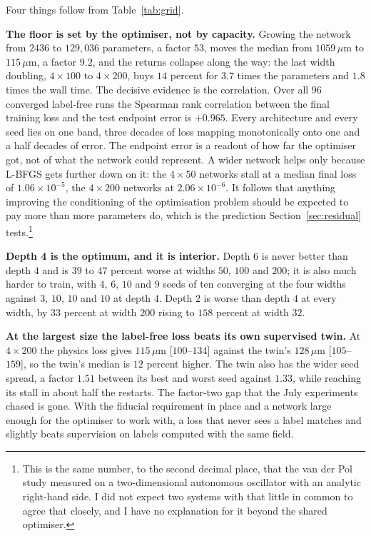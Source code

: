 \documentclass[11pt,a4paper]{article}
\newcommand{\um}{\ensuremath{\,\mu\mathrm{m}}}
\begin{document}
Four things follow from Table~\ref{tab:grid}.

\textbf{The floor is set by the optimiser, not by capacity.} Growing the network
from $2436$ to $129{,}036$ parameters, a factor $53$, moves the median from
$1059\um$ to $115\um$, a factor $9.2$, and the returns collapse along the way:
the last width doubling, $4 \times 100$ to $4 \times 200$, buys $14$ percent for
$3.7$ times the parameters and $1.8$ times the wall time. The decisive evidence
is the correlation. Over all $96$ converged label-free runs the Spearman rank
correlation between the final training loss and the test endpoint error is
$+0.965$. Every architecture and every seed lies on one band, three decades of
loss mapping monotonically onto one and a half decades of error. The endpoint
error is a readout of how far the optimiser got, not of what the network could
represent. A wider network helps only because L-BFGS gets further down on it:
the $4 \times 50$ networks stall at a median final loss of
$1.06 \times 10^{-5}$, the $4 \times 200$ networks at $2.06 \times 10^{-6}$. It
follows that anything improving the conditioning of the optimisation problem
should be expected to pay more than more parameters do, which is the prediction
Section~\ref{sec:residual} tests.\footnote{This is the same number, to the
second decimal place, that the van der Pol study measured on a two-dimensional
autonomous oscillator with an analytic right-hand side. I did not expect two
systems with that little in common to agree that closely, and I have no
explanation for it beyond the shared optimiser.}

\textbf{Depth 4 is the optimum, and it is interior.} Depth $6$ is never better
than depth $4$ and is $39$ to $47$ percent worse at widths $50$, $100$ and
$200$; it is also much harder to train, with $4$, $6$, $10$ and $9$ seeds of ten
converging at the four widths against $3$, $10$, $10$ and $10$ at depth $4$.
Depth $2$ is worse than depth $4$ at every width, by $33$ percent at width $200$
rising to $158$ percent at width $32$.

\textbf{At the largest size the label-free loss beats its own supervised twin.}
At $4 \times 200$ the physics loss gives $115\um$ [$100$--$134$] against the
twin's $128\um$ [$105$--$159$], so the twin's median is $12$ percent higher. The
twin also has the wider seed spread, a factor $1.51$ between its best and worst
seed against $1.33$, while reaching its stall in about half the restarts. The
factor-two gap that the July experiments chased is gone. With the fiducial
requirement in place and a network large enough for the optimiser to work with,
a loss that never sees a label matches and slightly beats supervision on labels
computed with the same field.
\end{document}
